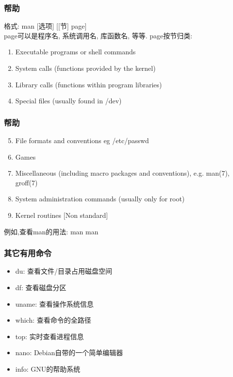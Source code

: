 \documentclass[compress]{beamer}
\begin{document}
\begin{frame}
\frametitle{帮助}
格式: \alert{man} [选项] [[节] page] \\
page可以是程序名, 系统调用名, 库函数名, 等等. page按节归类:

\begin{enumerate}
\item   Executable programs or shell commands
\item   System calls (functions provided by the kernel)
\item   Library calls (functions within program libraries)
\item   Special files (usually found in /dev)
  \end{enumerate}
  
\end{frame}


\begin{frame}
\frametitle{帮助}
\begin{enumerate}
\setcounter{enumi}{4}
\item   File formats and conventions eg /etc/passwd
\item   Games
\item   Miscellaneous  (including  macro  packages and conventions), e.g. man(7), groff(7)
\item   System administration commands (usually only for root)
\item   Kernel routines [Non standard]
\end{enumerate}

例如,查看man的用法: \alert{man man}
 
\end{frame}

\begin{frame}
\frametitle{其它有用命令}
\begin{itemize}
\item \alert{du}: 查看文件/目录占用磁盘空间
\item \alert{df}: 查看磁盘分区
\item \alert{uname}: 查看操作系统信息
\item \alert{which}: 查看命令的全路径
\item \alert{top}: 实时查看进程信息
\item \alert{nano}: Debian自带的一个简单编辑器
\item \alert{info}: GNU的帮助系统

\end{itemize}

\end{frame}
\end{document}
